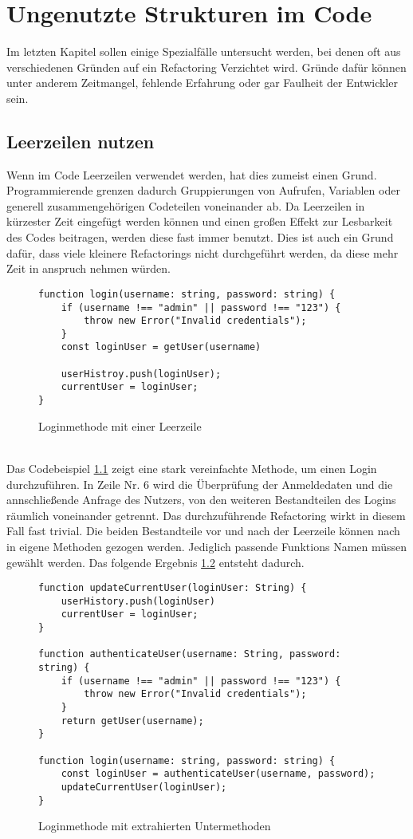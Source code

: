 \chapter{Ungenutzte Strukturen im Code}
Im letzten Kapitel sollen einige Spezialfälle untersucht werden, bei denen oft aus verschiedenen Gründen auf ein Refactoring Verzichtet wird.
Gründe dafür können unter anderem Zeitmangel, fehlende Erfahrung oder gar Faulheit der Entwickler sein.

\section{Leerzeilen nutzen}
Wenn im Code Leerzeilen verwendet werden, hat dies zumeist einen Grund. 
Programmierende grenzen dadurch Gruppierungen von Aufrufen, Variablen oder generell zusammengehörigen Codeteilen voneinander ab.
Da Leerzeilen in kürzester Zeit eingefügt werden können und einen großen Effekt zur Lesbarkeit des Codes beitragen, werden diese fast immer benutzt.
Dies ist auch ein Grund dafür, dass viele kleinere Refactorings nicht durchgeführt werden, da diese mehr Zeit in anspruch nehmen würden. \citep[S. 325]{fiveLines.2023}
\begin{figure}[ht]
    \centering
        \begin{verbatim}
function login(username: string, password: string) {
    if (username !== "admin" || password !== "123") {
        throw new Error("Invalid credentials");
    }
    const loginUser = getUser(username)

    userHistroy.push(loginUser);
    currentUser = loginUser;
}
        \end{verbatim}
    \caption{Loginmethode mit einer Leerzeile}
    \label{fig:LoginLeerzeile}
\end{figure}\\
Das Codebeispiel \ref{fig:LoginLeerzeile} zeigt eine stark vereinfachte Methode, um einen Login durchzuführen.
In Zeile Nr. 6 wird die Überprüfung der Anmeldedaten und die annschließende Anfrage des Nutzers, von den weiteren Bestandteilen des Logins räumlich voneinander getrennt.
Das durchzuführende Refactoring wirkt in diesem Fall fast trivial.
Die beiden Bestandteile vor und nach der Leerzeile können nach \citep[S. 325]{fiveLines.2023} in eigene Methoden gezogen werden.
Jediglich passende Funktions Namen müssen gewählt werden.
Das folgende Ergebnis \ref{fig:LoginErgebnis} entsteht dadurch.
\begin{figure}[ht]
    \centering
        \begin{verbatim}
function updateCurrentUser(loginUser: String) {
    userHistory.push(loginUser)
    currentUser = loginUser;
}

function authenticateUser(username: String, password: string) {
    if (username !== "admin" || password !== "123") {
        throw new Error("Invalid credentials");
    }
    return getUser(username);
}

function login(username: string, password: string) {
    const loginUser = authenticateUser(username, password);
    updateCurrentUser(loginUser);
}
        \end{verbatim}
    \caption{Loginmethode mit extrahierten Untermethoden}
    \label{fig:LoginErgebnis}
\end{figure}
